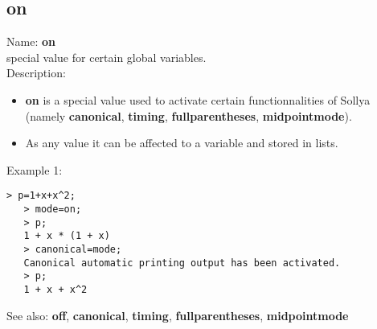 \subsection{ on }
\noindent Name: \textbf{on}\\
special value for certain global variables.\\

\noindent Description: \begin{itemize}

\item \textbf{on} is a special value used to activate certain functionnalities of Sollya
   (namely \textbf{canonical}, \textbf{timing}, \textbf{fullparentheses}, \textbf{midpointmode}).

\item As any value it can be affected to a variable and stored in lists.
\end{itemize}
\noindent Example 1: 
\begin{center}\begin{minipage}{14.8cm}\begin{Verbatim}[frame=single]
   > p=1+x+x^2;
   > mode=on;
   > p;
   1 + x * (1 + x)
   > canonical=mode;
   Canonical automatic printing output has been activated.
   > p;
   1 + x + x^2
\end{Verbatim}
\end{minipage}\end{center}
See also: \textbf{off}, \textbf{canonical}, \textbf{timing}, \textbf{fullparentheses}, \textbf{midpointmode}

